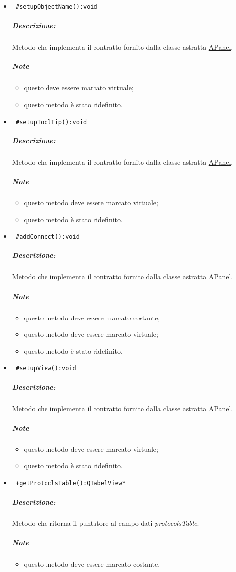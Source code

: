 \begin{itemize}
\item\color{blue}\verb! #setupObjectName():void!
\color{black}
\subparagraph{Descrizione:}Metodo che implementa il contratto fornito dalla classe astratta \hyperref[speAPanel]{APanel}.
 \subparagraph{Note}
 \begin{itemize}
  \item questo deve essere marcato virtuale;
 \item questo metodo è stato ridefinito.
 \end{itemize}
 
\item\color{blue}\verb! #setupToolTip():void!
\color{black}
\subparagraph{Descrizione:}Metodo che implementa il contratto fornito dalla classe astratta \hyperref[speAPanel]{APanel}.
 \subparagraph{Note}
 \begin{itemize}
 \item questo metodo deve essere marcato virtuale;
 \item questo metodo è stato ridefinito.
 \end{itemize}
 
\item\color{blue}\verb! #addConnect():void!

\color{black}
\subparagraph{Descrizione:}Metodo che implementa il contratto fornito dalla classe astratta \hyperref[speAPanel]{APanel}.
 \subparagraph{Note}
 \begin{itemize}
 \item questo metodo deve essere marcato costante;
 \item questo metodo deve essere marcato virtuale;
 \item questo metodo è stato ridefinito.
 \end{itemize}
 
\item\color{blue}\verb! #setupView():void!
\color{black}
\subparagraph{Descrizione:}Metodo che implementa il contratto fornito dalla classe astratta \hyperref[speAPanel]{APanel}.
 \subparagraph{Note}
 \begin{itemize}
 \item questo metodo deve essere marcato virtuale;
 \item questo metodo è stato ridefinito.
 \end{itemize}

\item\color{blue}\verb! +getProtoclsTable():QTabelView*!
\color{black}
\subparagraph{Descrizione:}Metodo che ritorna il puntatore al campo dati \emph{protocolsTable}.
 \subparagraph{Note}
 \begin{itemize}
 \item questo metodo deve essere marcato costante.
 \end{itemize}


\end{itemize}
